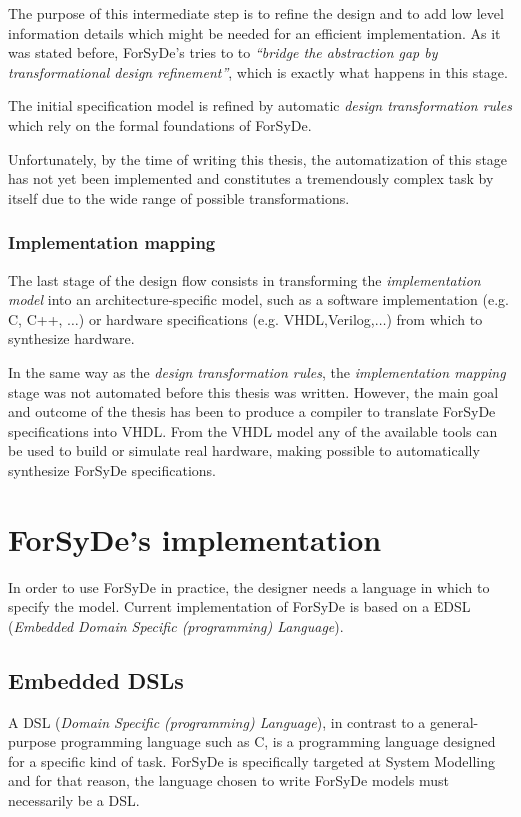 The purpose of this intermediate step is to refine the design and to
add low level information details which might be needed for an
efficient implementation. As it was stated before, ForSyDe's tries to
to \textit{``bridge the abstraction gap by transformational design
  refinement''}, which is exactly what happens in this stage.

The initial specification model is refined by automatic \textit{design
  transformation rules} which rely on the formal foundations of
ForSyDe.

Unfortunately, by the time of writing this thesis, the automatization
of this stage has not yet been implemented and constitutes a
tremendously complex task by itself due to the wide range of possible
transformations.

\subsubsection{Implementation mapping}

The last stage of the design flow consists in transforming the
\textit{implementation model} into an architecture-specific model,
such as a software implementation (e.g. C, C++, $\dots$) or hardware
specifications (e.g. VHDL,Verilog,$\dots$) from which to synthesize
hardware.


In the same way as the \textit{design transformation rules}, the
\textit{implementation mapping} stage was not automated before this
thesis was written. However, the main goal and outcome of the thesis
has been to produce a compiler to translate ForSyDe specifications
into VHDL. From the VHDL model any of the available tools can be used
to build or simulate real hardware, making possible to automatically
synthesize ForSyDe specifications.

\section{ForSyDe's implementation}
In order to use ForSyDe in practice, the designer needs a language in
which to specify the model. Current implementation of ForSyDe is based
on a EDSL (\textit{Embedded Domain Specific (programming) Language}).

\subsection{Embedded DSLs}

A DSL (\textit{Domain Specific (programming) Language}), in contrast
to a general-purpose programming language such as C, is a programming
language designed for a specific kind of task.  ForSyDe is
specifically targeted at System Modelling and for that reason, the
language chosen to write ForSyDe models must necessarily be a DSL.


